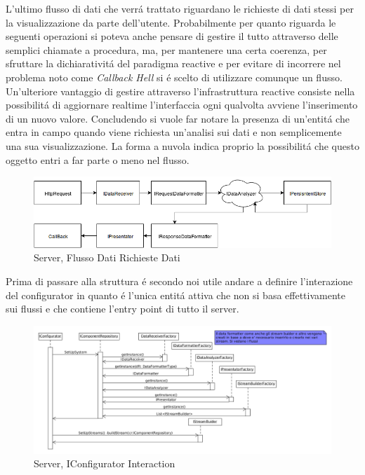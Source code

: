 L'ultimo flusso di dati che verr\'a trattato riguardano le richieste di dati stessi per la visualizzazione da parte dell'utente. Probabilmente per quanto riguarda le seguenti operazioni si poteva anche pensare di gestire il tutto attraverso delle semplici chiamate a procedura, ma, per mantenere una certa coerenza, per sfruttare la dichiarativit\'a del paradigma reactive e per evitare di incorrere nel problema noto come \textit{Callback Hell} si \'e scelto di utilizzare comunque un flusso. Un'ulteriore vantaggio di gestire attraverso l'infrastruttura reactive consiste nella possibilit\'a di aggiornare realtime l'interfaccia ogni qualvolta avviene l'inserimento di un nuovo valore. Concludendo si vuole far notare la presenza di un'entit\'a che entra in campo quando viene richiesta un'analisi sui dati e non semplicemente una sua visualizzazione. La forma a nuvola indica proprio la possibilit\'a che questo oggetto entri a far parte o meno nel flusso.

\begin{figure}[h]
\centering
\includegraphics[width=\textwidth]{Figures/LogicArchitecture/Server/FlowDiagramViewData}
\caption{Server, Flusso Dati Richieste Dati}
\end{figure}


Prima di passare alla struttura \'e secondo noi utile andare a definire l'interazione del configurator in quanto \'e l'unica entit\'a attiva che non si basa effettivamente sui flussi e che contiene l'entry point di tutto il server.

\begin{figure}[h]
\centering
\includegraphics[width=\textwidth]{Figures/LogicArchitecture/Server/IConfiguratorInteraction}
\caption{Server, IConfigurator Interaction}
\end{figure}

